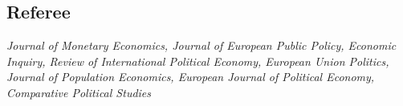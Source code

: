 \documentclass[margin, line]{res}
\newenvironment{list1}{
 \begin{list}{\ding{113}}{%
  \setlength{\itemsep}{0in}
  \setlength{\parsep}{0in} \setlength{\parskip}{0in}
  \setlength{\topsep}{0in} \setlength{\partopsep}{0in} 
  \setlength{\leftmargin}{0.17in}}}{\end{list}}
\begin{document}
\begin{resume}
\section{\sc Referee}

\textit{Journal of Monetary Economics, Journal of European Public Policy, Economic Inquiry, Review of International Political Economy, European Union Politics, Journal of Population Economics, European Journal of Political Economy, Comparative Political Studies}

\begin{comment}

\section{\sc Additional Training}


\textbf{Nuffield College, Oxford University} \hfill Oxford, UK  \\
\vspace*{-.12in}
\begin{list1}
\item[] CESS/Essex Summer School, \textit{Introduction to Experiments} (Ray Duch), 7/2018
\end{list1}

\textbf{Essex University} \hfill Colchester, UK  \\
\vspace*{-.12in}
\begin{list1}
\item[] Essex Summer School, \textit{Quantitative Text Analysis} (Nicole Baerg), 8/2017
\end{list1}

\textbf{Graduate Institute of International and Development Studies} \hfill Geneva, Switzerland \\
\vspace*{-.12in}
\begin{list1}
\item[] \textit{Game Theory} (C{\'e}dric Dupont), 9/2017-12/2017
\vspace*{.04in}
\item[] \textit{Advanced Econometrics} (Ugo Panizza), 2/2017-5/2017
\end{list1}


\end{comment}
\end{resume}
\end{document}

